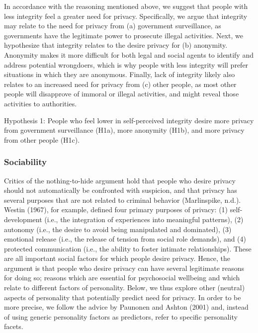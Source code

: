 \documentclass[man,floatsintext]{apa6}
\theoremstyle{definition}
\theoremstyle{definition}
\theoremstyle{definition}
\theoremstyle{remark}
\begin{document}
In accordance with the reasoning mentioned above, we suggest that people
with less integrity feel a greater need for privacy. Specifically, we
argue that integrity may relate to the need for privacy from (a)
government surveillance, as governments have the legitimate power to
prosecute illegal activities. Next, we hypothesize that integrity
relates to the desire privacy for (b) anonymity. Anonymity makes it more
difficult for both legal and social agents to identify and address
potential wrongdoers, which is why people with less integrity will
prefer situations in which they are anonymous. Finally, lack of
integrity likely also relates to an increased need for privacy from (c)
other people, as most other people will disapprove of immoral or illegal
activities, and might reveal those activities to authorities.

Hypothesis 1: People who feel lower in self-perceived integrity desire
more privacy from government surveillance (H1a), more anonymity (H1b),
and more privacy from other people (H1c).

\hypertarget{sociability}{%
\subsubsection{Sociability}\label{sociability}}

Critics of the nothing-to-hide argument hold that people who desire
privacy should not automatically be confronted with suspicion, and that
privacy has several purposes that are not related to criminal behavior
(Marlinspike, n.d.). Westin (1967), for example, defined four primary
purposes of privacy: (1) self-development (i.e., the integration of
experiences into meaningful patterns), (2) autonomy (i.e., the desire to
avoid being manipulated and dominated), (3) emotional release (i.e., the
release of tension from social role demands), and (4) protected
communication (i.e., the ability to foster intimate relationships).
These are all important social factors for which people desire privacy.
Hence, the argument is that people who desire privacy can have several
legitimate reasons for doing so; reasons which are essential for
psychosocial wellbeing and which relate to different factors of
personality. Below, we thus explore other (neutral) aspects of
personality that potentially predict need for privacy. In order to be
more precise, we follow the advice by Paunonen and Ashton (2001) and,
instead of using generic personality factors as predictors, refer to
specific personality facets.
\end{document}
